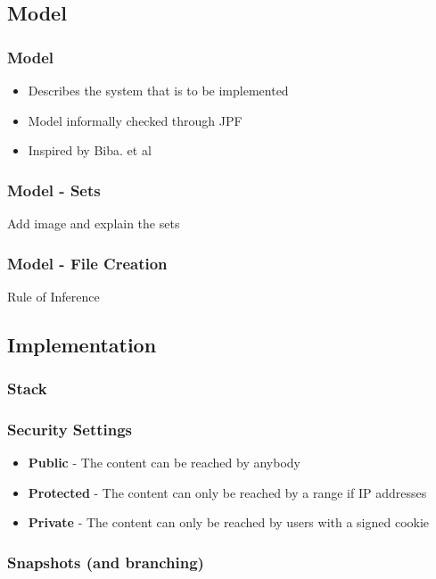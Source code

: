 \documentclass{beamer}
\begin{document}
\subsection{Model}
\begin{frame}
  \frametitle{Model}
  \begin{itemize}
    \item{Describes the system that is to be implemented}
    \pause
    \item{Model informally checked through JPF}
    \pause
    \item{Inspired by Biba. et al}
  \end{itemize}
\end{frame}

\begin{frame}
  \frametitle{Model - Sets}
  Add image and explain the sets
\end{frame}

\begin{frame}
  \frametitle{Model - File Creation}
  Rule of Inference
  \centerline{}
\end{frame}

\subsection{Implementation}
\begin{frame}
  \frametitle{Stack}
  \centerline{}
\end{frame}

\begin{frame}
  \frametitle{Security Settings}
  \begin{itemize}
    \item{\textbf{Public} - The content can be reached by anybody}
    \pause
    \item{\textbf{Protected} - The content can only be reached by a range if IP addresses}
    \pause
    \item{\textbf{Private} - The content can only be reached by users with a signed cookie}
  \end{itemize}
\end{frame}

\begin{frame}
  \frametitle{Snapshots (and branching)}
  \centerline{}
\end{frame}
\end{document}

